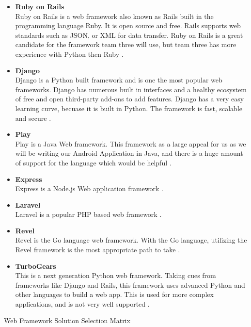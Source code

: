 \documentclass[Letter,11pt]{article}
\begin{document}
		\begin{itemize}
			\item \textbf{Ruby on Rails} \\
			Ruby on Rails is a web framework also known as Rails built in the programming language Ruby. It is open source and free. Rails supports web standards such as JSON, or XML for data transfer. Ruby on Rails is a great candidate for the framework team three will use, but team three has more experience with Python then Ruby \cite{rubyonrails}.  
			\item \textbf{Django} \\
			Django is a Python built framework and is one the most popular web frameworks. Django has numerous built in interfaces and a healthy ecosystem of free and open third-party add-ons to add features. Django has a very easy learning curve, becuase it is built in Python. The framework is fast, scalable and secure \cite{django}.
			\item \textbf{Play} \\

			Play is a Java Web framework. This framework as a large appeal for us as we will be writing our Android Application in Java, and there is a huge amount of support for the language which would be helpful \cite{play}.
			\item  \textbf{Express}\\
			Express is a Node.js Web application framework \cite{express}.
			\item \textbf{Laravel} \\
			Laravel is a popular PHP based web framework \cite{laravel}. 
			\item \textbf{Revel} \\
			Revel is the Go language web framework. With the Go language, utilizing the Revel framework is the most appropriate path to take \cite{revel}.
			\item \textbf{TurboGears}\\
			This is a next generation Python web framework. Taking cues from frameworks like Django and Rails, this framework uses advanced Python and other languages to build a web app. This is used for more complex applications, and is not very well supported \cite{turbogears}.
		\end{itemize}
		
		
	
		\begin{table}[h]
			\centering
			
			\caption{\label{WebMatrix} Web Framework Solution Selection Matrix}
		\end{table}
	
\end{document}
